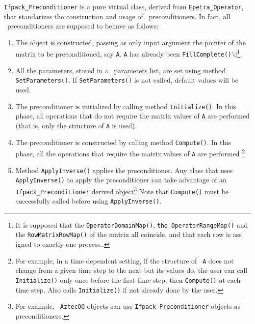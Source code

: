 {\verb!Ifpack_Preconditioner! is a pure virtual class, derived from
\verb!Epetra_Operator!, that standarizes the construction and usage of \ifpack\
preconditioners. In fact, all \ifpack\ preconditioners are supposed to behave
as follows:
\begin{enumerate}
\item The object is constructed, passing as only input argument the
pointer of the matrix to be preconditioned, say {\tt A}. {\tt A} has already
been {\tt FillComplete()}'d\footnote{It is supposed that the {\tt OperatorDomainMap()}, {\tt the OperatorRangeMap()}
and
the {\tt RowMatrixRowMap()} of the matrix all coincide, and that each row is ass
igned
to exactly one process..}.
%
\item All the parameters, stored in a \teuchos\ parameters list, are
set using method \verb!SetParameters()!. If \verb!SetParameters()! is not
called, default values will be used.
%
\item The preconditioner is initialized by calling method \verb!Initialize()!.
In this phase, all operations that do not require the matrix values of {\tt A}
are performed (that is, only the structure of {\tt A} is used).
%
\item The preconditioner is constructed by calling method \verb!Compute()!.
In this phase, all the operations that require the matrix values of {\tt A}
are performed
\footnote{For example, in a time dependent setting, if the structure of {\tt
  A} does not change from a given time step to the next but its values do,
  the user can call {\tt Initialize()} only once before the first time step,
  then {\tt Compute()} at each time step. Also calls {\tt Initialize()} if
  not already done by the user.}
%
\item Method \verb!ApplyInverse()! applies the preconditioner. Any class that
uses \verb!ApplyInverse()! to apply the preconditioner can take advantage of
an \verb!Ifpack_Preconditioner! derived object\footnote{For example, {\tt
AztecOO} objects can use {\tt Ifpack\_Preconditioner} objects as
preconditioners.} Note that {\tt Compute()} must be successfully called before
using \verb!ApplyInverse()!.


\end{enumerate}}
